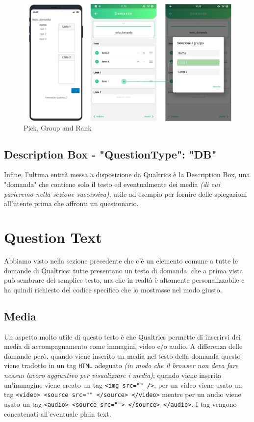 \begin{figure}[h!]
\centering
\includegraphics[width=\textwidth]{img/PGR}
\caption{Pick, Group and Rank}
\label{fig:PGR}
\end{figure}

\subsection{Description Box - "QuestionType": "DB"}
Infine, l'ultima entità messa a disposizione da Qualtrics è la Description Box, una "domanda" che contiene solo il testo ed eventualmente dei media \textit{(di cui parleremo nella sezione successiva)}, utile ad esempio per fornire delle spiegazioni all'utente prima che affronti un questionario.

\section{Question Text}
Abbiamo visto nella sezione precedente che c'è un elemento comune a tutte le domande di Qualtrics: tutte presentano un testo di domanda, che a prima vista può sembrare del semplice testo, ma che in realtà è altamente personalizzabile e ha quindi richiesto del codice specifico che lo mostrasse nel modo giusto.

\subsection{Media}
Un aspetto molto utile di questo testo è che Qualtrics permette di inserirvi dei media di accompagnamento come immagini, video e/o audio. A differenza delle domande però, quando viene inserito un media nel testo della domanda questo viene tradotto in un tag \texttt{HTML} adeguato \textit{(in modo che il browser non deva fare nessun lavoro aggiuntivo per visualizzare i media)}; quando viene inserita un'immagine viene creato un tag \texttt{<img src="" />}, per un video viene usato un tag \texttt{<video> <source src="" </source> </video>} mentre per un audio viene usato un tag \texttt{<audio> <source src=""> </source> </audio>}. I tag vengono concatenati all'eventuale plain text.

